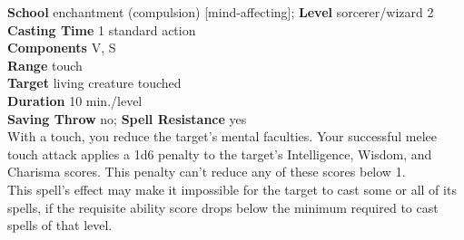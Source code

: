 \textbf{School} enchantment (compulsion) [mind-affecting]; \textbf{Level} sorcerer/wizard 2\\
\textbf{Casting Time} 1 standard action\\
\textbf{Components} V, S\\
\textbf{Range} touch\\
\textbf{Target} living creature touched\\
\textbf{Duration} 10 min./level\\
\textbf{Saving Throw} no; \textbf{Spell Resistance} yes\\
With a touch, you reduce the target's mental faculties. Your successful melee touch attack applies a 1d6 penalty to the target's Intelligence, Wisdom, and Charisma scores. This penalty can't reduce any of these scores below 1.\\
This spell's effect may make it impossible for the target to cast some or all of its spells, if the requisite ability score drops below the minimum required to cast spells of that level.\\
